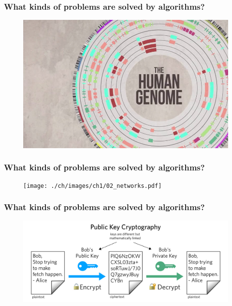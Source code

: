 \begin{frame}
    \frametitle{What kinds of problems are solved by algorithms?}

    \begin{figure}
        \centering
        \includegraphics[width = \linewidth]{./ch/images/ch1/01_human_genome_project.jpg}
    \end{figure}

\end{frame}

\begin{frame}
    \frametitle{What kinds of problems are solved by algorithms?}

    \begin{figure}
        \centering
        \texttt{[image: ./ch/images/ch1/02\_networks.pdf]}
    \end{figure}

\end{frame}

\begin{frame}
    \frametitle{What kinds of problems are solved by algorithms?}

    \begin{figure}
        \centering
        \includegraphics[width = \linewidth]{./ch/images/ch1/03_public_key_cryptography.png}
    \end{figure}

\end{frame}

